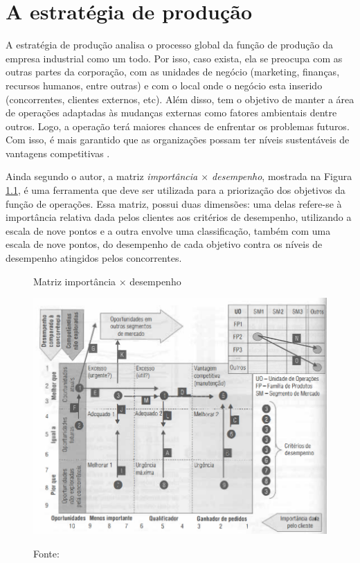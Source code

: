 \chapter{A estratégia de produção}
\label{chap:estrategia_da_producao}

A estratégia de produção analisa o processo global da função de produção da empresa industrial como um todo. Por isso, caso exista, ela se preocupa com as outras partes da corporação, com as unidades de negócio (marketing, finanças, recursos humanos, entre outras) e com o local onde o negócio esta inserido (concorrentes, clientes externos, etc). Além disso, tem o objetivo de manter a área de operações adaptadas às mudanças externas como fatores ambientais dentre outros. Logo, a operação terá maiores chances de enfrentar os problemas futuros. Com isso, é mais garantido que as organizações possam ter níveis sustentáveis de vantagens competitivas \cite{correa2000administracao}.

Ainda segundo o autor, a matriz \textit{importância $\times$ desempenho}, mostrada na Figura \ref{fig:matriz_importancia_desempenho}, é uma ferramenta que deve ser utilizada para a priorização dos objetivos da função de operações. Essa matriz, possui duas dimensões: uma delas refere-se à importância relativa dada pelos clientes aos critérios de desempenho, utilizando a escala de nove pontos e a outra envolve uma classificação, também com uma escala de nove pontos, do desempenho de cada objetivo contra os níveis de desempenho atingidos pelos concorrentes.

\begin{figure}[H]
  \caption{Matriz importância $\times$ desempenho}
  \includegraphics[width =1\textwidth]{images/impor_desem.png}
  \label{fig:matriz_importancia_desempenho}
  \caption*{Fonte: \cite{correa2000administracao}}
\end{figure}

